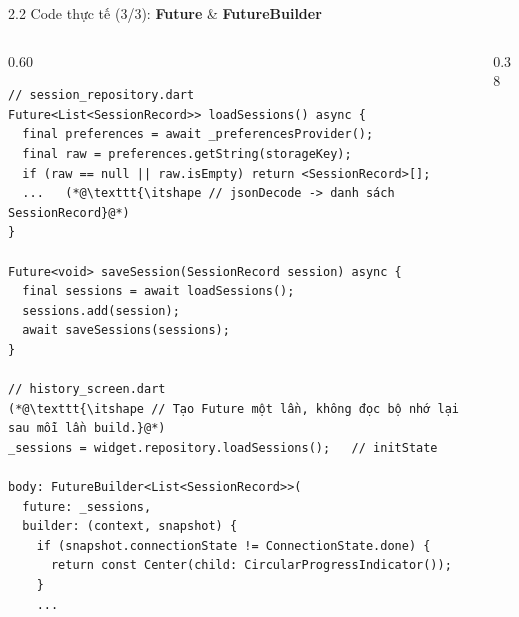 \documentclass[aspectratio=169,10pt]{beamer}
\newcommand{\api}[1]{\texttt{\bfseries #1}}   %
\begin{document}
\begin{frame}[fragile]{2.2 Code thực tế (3/3): \textbf{Future} \& \textbf{FutureBuilder}}
  \begin{columns}[T]
    \begin{column}{0.60\textwidth}
\begin{lstlisting}[basicstyle=\ttfamily\fontsize{6.4}{7.4}\selectfont]
// session_repository.dart
Future<List<SessionRecord>> loadSessions() async {
  final preferences = await _preferencesProvider();
  final raw = preferences.getString(storageKey);
  if (raw == null || raw.isEmpty) return <SessionRecord>[];
  ...   (*@\texttt{\itshape // jsonDecode -> danh sách SessionRecord}@*)
}

Future<void> saveSession(SessionRecord session) async {
  final sessions = await loadSessions();
  sessions.add(session);
  await saveSessions(sessions);
}

// history_screen.dart
(*@\texttt{\itshape // Tạo Future một lần, không đọc bộ nhớ lại sau mỗi lần build.}@*)
_sessions = widget.repository.loadSessions();   // initState

body: FutureBuilder<List<SessionRecord>>(
  future: _sessions,
  builder: (context, snapshot) {
    if (snapshot.connectionState != ConnectionState.done) {
      return const Center(child: CircularProgressIndicator());
    }
    ...
\end{lstlisting}
    \end{column}
    \begin{column}{0.38\textwidth}
      \footnotesize
    \end{column}
  \end{columns}
\end{frame}
\end{document}
